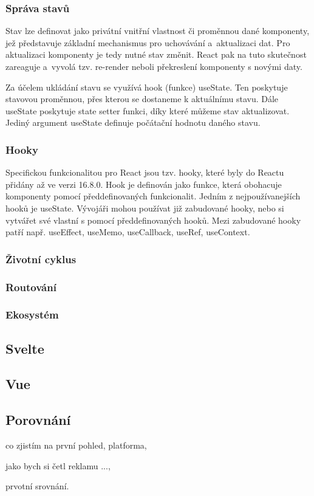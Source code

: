 \subsubsection{Správa stavů}

Stav lze definovat jako privátní vnitřní vlastnost či proměnnou dané komponenty, jež představuje základní mechanismus pro uchovávání a~aktualizaci dat. 
Pro aktualizaci komponenty je tedy nutné stav změnit. React pak na tuto skutečnost zareaguje a~vyvolá tzv. re-render neboli překreslení komponenty s novými daty.

Za účelem ukládání stavu se využívá hook (funkce) useState. Ten poskytuje stavovou proměnnou, přes kterou se dostaneme k aktuálnímu stavu. 
Dále useState poskytuje state setter funkci, díky které můžeme stav aktualizovat. Jediný argument useState definuje počátační hodnotu daného stavu.\cite{reactitnetwork,react}

\subsubsection{Hooky}

Specifickou funkcionalitou pro React jsou tzv. hooky, které byly do Reactu přidány až ve verzi 16.8.0. 
Hook je definován jako funkce, která obohacuje komponenty pomocí předdefinovaných funkcionalit. Jedním z nejpoužívanejších hooků je useState. 
Vývojáři mohou používat již zabudované hooky, nebo si vytvářet své vlastní s pomocí předdefinovaných hooků. 
Mezi zabudované hooky patří např. useEffect, useMemo, useCallback, useRef, useContext.\cite{react,reactgithub}

\subsubsection{Životní cyklus}
\subsubsection{Routování}
\subsubsection{Ekosystém}



\subsection{Svelte}

\subsection{Vue}

\subsection{Porovnání}

\begin{citemize}
	\item co zjistím na první pohled, platforma,
	\item jako bych si četl reklamu ...,
	\item prvotní srovnání.
\end{citemize}
